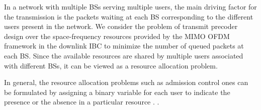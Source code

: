 In a network with multiple \acp{BS} serving multiple users, the main driving factor for the transmission is the packets waiting at each \ac{BS} corresponding to the different users present in the network. We consider the problem of transmit precoder design over the space-frequency resources provided by the \ac{MIMO} \ac{OFDM} framework in the downlink \ac{IBC} to minimize the number of queued packets at each \ac{BS}. Since the available resources are shared by multiple users associated with different \acp{BS}, it can be viewed as a resource allocation problem.

In general, the resource allocation problems such as admission control ones can be formulated by assigning a binary variable for each user to indicate the presence or the absence in a particular resource \cite{admission_control}. .


